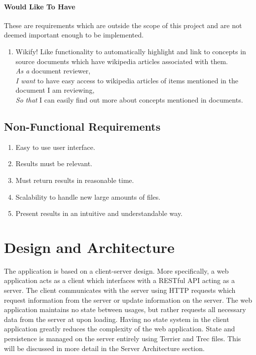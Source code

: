 \documentclass{l4proj}
\begin{document}
\paragraph{Would Like To Have}
These are requirements which are outside the scope of this project and are not deemed important enough to be implemented.
\begin{enumerate}[label=\textbf{W.\arabic*}]
\item Wikify! Like functionality to automatically highlight and link to concepts in source documents which have wikipedia articles associated with them. \\
\textit{As a} document reviewer, \\
\textit{I want} to have easy access to wikipedia articles of items mentioned in the document I am reviewing, \\
\textit{So that} I can easily find out more about concepts mentioned in documents.
\end{enumerate}

\subsection{Non-Functional Requirements}
\begin{enumerate}[label=\textbf{NF.\arabic*}]
\item Easy to use user interface.
\item Results must be relevant.
\item Must return results in reasonable time.
\item Scalability to handle new large amounts of files.
\item Present results in an intuitive and understandable way.
\end{enumerate}

\section{Design and Architecture}
The application is based on a client-server design. More specifically, a web application acts as a client which interfaces with a RESTful API acting as a server.
The client communicates with the server using HTTP requests which request information from the server or update information on the server.
The web application maintains no state between usages, but rather requests all necessary data from the server at upon loading. Having no state system in the client application greatly reduces the complexity of the web application.
State and persistence is managed on the server entirely using Terrier and Trec files. This will be discussed in more detail in the Server Architecture section.
\end{document}
